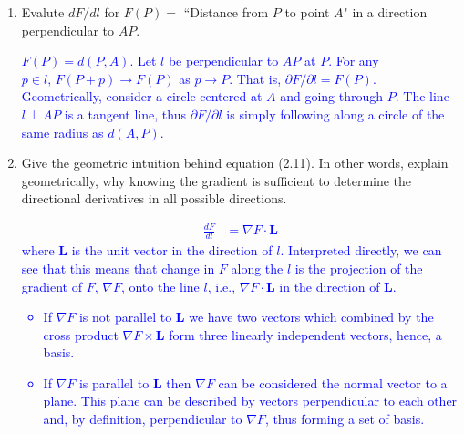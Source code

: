 \documentclass[12pt,a4paper]{report}
\newcommand{\BLUE}[1]{\textcolor{blue}{#1}}
\newcommand{\VK}[1]{\textbf{#1}}
\begin{document}
\begin{enumerate}[label=\textbf{2.\arabic*.}]
\begin{center}
\end{center}
  

\item Evalute $d F/dl$ for $F(P) = $ ``Distance from $P$ to point $A$" in a direction perpendicular to $AP$.

\BLUE{$F(P) = d(P, A)$.  Let $l$ be perpendicular to $AP$ at $P$.  For any $p \in l,\, F(P+p) \to F(P)$ as $p \to P$.  That is, $\partial F/\partial l = F(P)$.  Geometrically, consider a circle centered at $A$ and going through $P$.  The line $l \perp AP$ is a tangent line, thus $\partial F/\partial l$ is simply following along a circle of the same radius as $d(A,P)$.
}
\setcounter{enumi}{13}
\item Give the geometric intuition behind equation (2.11). In other words, explain geometrically, why knowing the gradient is sufficient to determine the directional derivatives in all possible directions.

\BLUE{\begin{align*}
	\frac{dF}{dl} &= \nabla F\cdot \VK{L}
\end{align*}where $\VK{L}$ is the unit vector in the direction of $l$.  Interpreted directly, we can see that this means that change in $F$ along the $l$ is the projection of the gradient of $F$, $\nabla F$, onto the line $l$, i.e., $\nabla F \cdot \VK{L}$ in the direction of $\VK{L}$. 
\begin{itemize}
\item If $\nabla F$ is not parallel to $\VK{L}$ we have two vectors which combined by the cross product $\nabla F \times \VK{L}$ form three linearly independent vectors, hence, a basis.
\item If $\nabla F$ is parallel to $\VK{L}$ then $\nabla F$ can be considered the normal vector to a plane.  This plane can be described by vectors perpendicular to each other and, by definition, perpendicular to $\nabla F$, thus forming a set of basis.
\end{itemize}
}

\end{enumerate}
\HLINE
\end{document}
